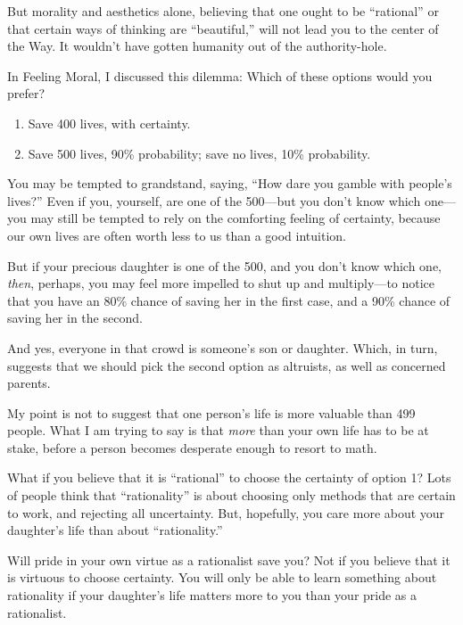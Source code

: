 {
 But morality and aesthetics alone, believing that one ought to be
``rational'' or that certain ways of
thinking are ``beautiful,'' will not
lead you to the center of the Way. It wouldn't have
gotten humanity out of the authority-hole.}

{
 In Feeling Moral, I discussed this dilemma: Which of these options
would you prefer?}

\begin{enumerate}
\item {
 Save 400 lives, with certainty.}

\item {
 Save 500 lives, 90\% probability; save no lives, 10\%
 probability.}
\end{enumerate}

{
 You may be tempted to grandstand, saying, ``How
dare you gamble with people's
lives?'' Even if you, yourself, are one of the
500---but you don't know which one---you may still be
tempted to rely on the comforting feeling of certainty, because our own
lives are often worth less to us than a good intuition.}

{
 But if your precious daughter is one of the 500, and you
don't know which one, \textit{then}, perhaps, you may
feel more impelled to shut up and multiply---to notice that you have an
80\% chance of saving her in the first case, and a 90\% chance of
saving her in the second.}

{
 And yes, everyone in that crowd is someone's son
or daughter. Which, in turn, suggests that we should pick the second
option as altruists, as well as concerned parents.}

{
 My point is not to suggest that one person's life
is more valuable than 499 people. What I am trying to say is that
\textit{more} than your own life has to be at stake, before a person
becomes desperate enough to resort to math.}

{
 What if you believe that it is
``rational'' to choose the certainty
of option 1? Lots of people think that
``rationality'' is about choosing
only methods that are certain to work, and rejecting all uncertainty.
But, hopefully, you care more about your daughter's
life than about ``rationality.''}

{
 Will pride in your own virtue as a rationalist save you? Not if
you believe that it is virtuous to choose certainty. You will only be
able to learn something about rationality if your
daughter's life matters more to you than your pride as
a rationalist.}

